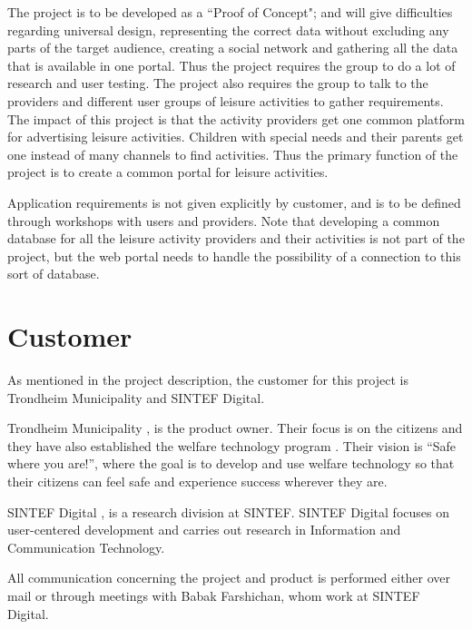 The project is to be developed as a “Proof of Concept"; and will give difficulties regarding universal design, representing the correct data without excluding any parts of the target audience, creating a social network and gathering all the data that is available in one portal. Thus the project requires the group to do a lot of research and user testing. The project also requires the group to talk to the providers and different user groups of leisure activities to gather requirements. The impact of this project is that the activity providers get one common platform for advertising leisure activities. Children with special needs and their parents get one instead of many channels to find activities. Thus the primary function of the project is to create a common portal for leisure activities.

Application requirements is not given explicitly by customer, and is to be defined through workshops with users and providers. Note that developing a common database for all the leisure activity providers and their activities is not part of the project, but the web portal needs to handle the possibility of a connection to this sort of database.  

\section{Customer}
As mentioned in the project description, the customer for this project is Trondheim Municipality and SINTEF Digital.

Trondheim Municipality \cite{TrondheimMunicipality}, is the product owner. Their focus is on the citizens and they have also established the welfare technology program \cite{WelfareProgram}. Their vision is “Safe where you are!”, where the goal is to develop and use welfare technology so that their citizens can feel safe and experience success wherever they are.

SINTEF Digital \cite{SintefDigital}, is a research division at SINTEF. SINTEF Digital focuses on user-centered development and carries out research in Information and Communication Technology.

All communication concerning the project and product is performed either over mail or through meetings with Babak Farshichan, whom work at SINTEF Digital.

\cleardoublepage